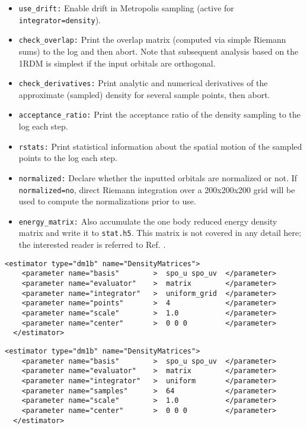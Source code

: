 \begin{itemize}
  \item{\texttt{use\_drift:} Enable drift in Metropolis sampling  (active for \texttt{integrator=density}).}
  \item{\texttt{check\_overlap:} Print the overlap matrix (computed via simple Riemann sums) to the log and then abort.  Note that subsequent analysis based on the 1RDM is simplest if the input orbitals are orthogonal.}
  \item{\texttt{check\_derivatives:} Print analytic and numerical derivatives of the approximate (sampled) density for several sample points, then abort. }
  \item{\texttt{acceptance\_ratio:} Print the acceptance ratio of the density sampling to the log each step.}
  \item{\texttt{rstats:} Print statistical information about the spatial motion of the sampled points to the log each step.}
  \item{\texttt{normalized:} Declare whether the inputted orbitals are normalized or not.  If \texttt{normalized=no}, direct Riemann integration over a 200x200x200 grid will be used to compute the normalizations prior to use.}
  \item{\texttt{energy\_matrix:} Also accumulate the one body reduced energy density matrix and write it to \texttt{stat.h5}.  This matrix is not covered in any detail here; the interested reader is referred to Ref. \cite{Krogel2014}.}
\end{itemize}


\begin{lstlisting}[caption=One body density matrix with uniform grid integration.]
  <estimator type="dm1b" name="DensityMatrices">
    <parameter name="basis"        >  spo_u spo_uv  </parameter>
    <parameter name="evaluator"    >  matrix        </parameter>
    <parameter name="integrator"   >  uniform_grid  </parameter>
    <parameter name="points"       >  4             </parameter>
    <parameter name="scale"        >  1.0           </parameter>
    <parameter name="center"       >  0 0 0         </parameter>
  </estimator>
\end{lstlisting}


\begin{lstlisting}[caption=One body density matrix with uniform sampling.]
  <estimator type="dm1b" name="DensityMatrices">
    <parameter name="basis"        >  spo_u spo_uv  </parameter>
    <parameter name="evaluator"    >  matrix        </parameter>
    <parameter name="integrator"   >  uniform       </parameter>
    <parameter name="samples"      >  64            </parameter>
    <parameter name="scale"        >  1.0           </parameter>
    <parameter name="center"       >  0 0 0         </parameter>
  </estimator>
\end{lstlisting}


